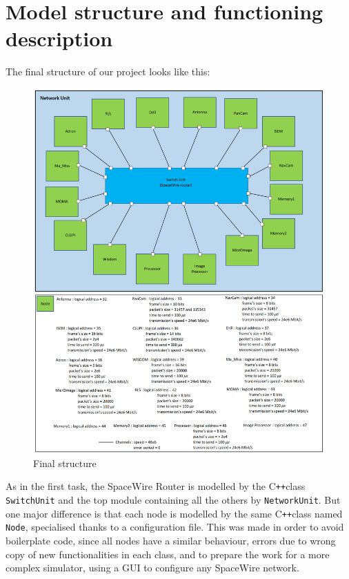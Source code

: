 \documentclass[12pt,a4paper]{article}
\newcommand{\Cpp}{C\texttt{++}}
\begin{document}
\section{Model structure and functioning description}
\label{sec:structure}
\smallbreak
The final structure of our project looks like this: \smallbreak
\begin{figure}[h]
\centering
\includegraphics[scale=.5]{pictures/network_structure.png}
\caption{Final structure}
\end{figure}
\smallbreak

As in the first task, the SpaceWire Router is modelled by the \Cpp class \texttt{SwitchUnit} and the top module containing all the others by \texttt{NetworkUnit}. But one major difference is that each node is modelled by the same \Cpp class named \texttt{Node}, specialised thanks to a configuration file. This was made in order to avoid boilerplate code, since all nodes have a similar behaviour, errors due to wrong copy of new functionalities in each class, and to prepare the work for a more complex simulator, using a GUI to configure any SpaceWire network.
\end{document}
